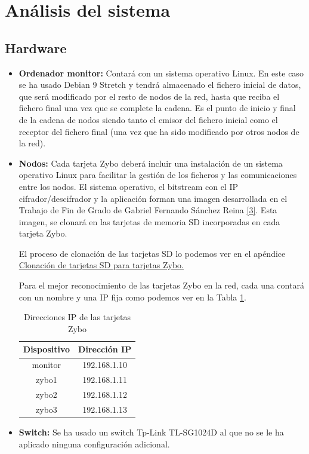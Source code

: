 \section{Análisis del sistema}
\subsection{Hardware}
\begin{itemize}
	\item \textbf{Ordenador monitor:} Contará con un sistema operativo Linux. En este caso se ha usado Debian 9 Stretch y tendrá almacenado el fichero inicial de datos, que será modificado por el resto de nodos de la red, hasta que reciba el fichero final una vez que se complete la cadena. Es el punto de inicio y final de la cadena de nodos siendo tanto el emisor del fichero inicial como el receptor del fichero final (una vez que ha sido modificado por otros nodos de la red).
	\item \textbf{Nodos:} Cada tarjeta Zybo deberá incluir una instalación de un sistema operativo Linux para facilitar la gestión de los ficheros y las comunicaciones entre los nodos. El sistema operativo, el bitstream con el IP cifrador/descifrador y la aplicación forman una imagen desarrollada en el Trabajo de Fin de Grado de Gabriel Fernando Sánchez Reina \hyperlink{3}{[3]}. Esta imagen, se clonará en las tarjetas de memoria SD incorporadas en cada tarjeta Zybo.
	
	El proceso de clonación de las tarjetas SD lo podemos ver en el apéndice \hyperlink{InstalacionLinux}{Clonación de tarjetas SD para tarjetas Zybo.}
	
	Para el mejor reconocimiento de las tarjetas Zybo en la red, cada una contará con un nombre y una IP fija como podemos ver en la Tabla \ref{Direcciones IP de las tarjetas Zybo}.
	\begin{table}[h]
		\centering
		\begin{tabular}{|c|c|}
			\hline
			\textbf{Dispositivo} & \textbf{Dirección IP} \\ \hline
			monitor & 192.168.1.10 \\ \hline
			zybo1 & 192.168.1.11 \\ \hline
			zybo2 & 192.168.1.12 \\ \hline
			zybo3 & 192.168.1.13 \\ \hline
		\end{tabular}
		\caption{Direcciones IP de las tarjetas Zybo}
		\label{Direcciones IP de las tarjetas Zybo}
	\end{table}
	\item \textbf{Switch:} Se ha usado un switch Tp-Link TL-SG1024D al que no se le ha aplicado ninguna configuración adicional.
\end{itemize}



